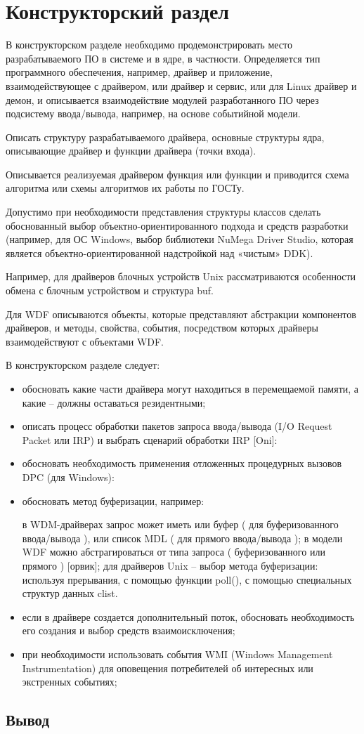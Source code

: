 \chapter{Конструкторский раздел}

В конструкторском разделе необходимо продемонстрировать место разрабатываемого ПО в системе и в ядре, в частности. Определяется тип программного обеспечения, например, драйвер и приложение, взаимодействующее с драйвером, или драйвер и сервис, или для Linux драйвер и демон, и описывается взаимодействие модулей разработанного ПО через подсистему ввода/вывода, например, на основе событийной модели.

Описать структуру разрабатываемого драйвера, основные структуры ядра, описывающие драйвер и функции драйвера (точки входа).

Описывается реализуемая драйвером функция или функции и приводится схема алгоритма или схемы алгоритмов их работы по ГОСТу.

Допустимо при необходимости представления структуры классов сделать обоснованный выбор объектно-ориентированного подхода и средств разработки (например, для ОС Windows, выбор библиотеки NuMega Driver Studio, которая является объектно-ориентированной надстройкой над «чистым» DDK).

Например, для драйверов блочных устройств Unix рассматриваются особенности обмена с блочным устройством и структура buf.

Для WDF описываются объекты, которые представляют абстракции компонентов драйверов, и методы, свойства, события, посредством которых драйверы взаимодействуют с объектами WDF.

В конструкторском разделе следует:
\begin{itemize}
	\item обосновать какие части драйвера могут находиться в перемещаемой памяти, а какие – должны оставаться резидентными;
	\item описать процесс обработки пакетов запроса ввода/вывода (I/O Request Packet или IRP) и выбрать сценарий обработки IRP [Oni]:
	\item обосновать необходимость применения отложенных процедурных вызовов DPC (для Windows):
	\item обосновать метод буферизации, например:

	в WDM-драйверах запрос может иметь или буфер ( для буферизованного ввода/вывода ), или список MDL ( для прямого ввода/вывода ); в модели WDF можно абстрагироваться от типа запроса ( буферизованного или прямого ) [орвик]; для драйверов Unix – выбор метода
	буферизации: используя прерывания, с помощью функции poll(), с помощью специальных
	структур данных clist.

	\item если в драйвере создается дополнительный поток, обосновать необходимость его
	создания и выбор средств взаимоисключения;

	\item при необходимости использовать события WMI (Windows Management Instrumentation)
	для оповещения потребителей об интересных или экстренных событиях;
\end{itemize}

\section*{Вывод}